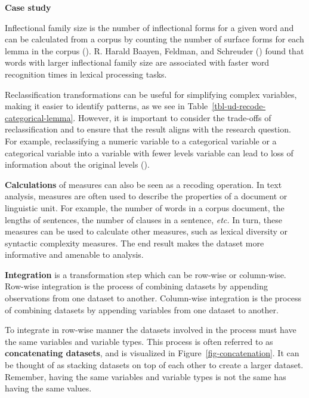 \documentclass[
  letterpaper,
]{latex/krantz}
\theoremstyle{definition}
\theoremstyle{remark}
\begin{document}
\begin{tcolorbox}[enhanced jigsaw, breakable, leftrule=.75mm, arc=.35mm, colframe=quarto-callout-color-frame, colback=white, left=2mm, bottomrule=.15mm, rightrule=.15mm, toprule=.15mm, opacityback=0]

\textbf{ Case study}

Inflectional family size is the number of inflectional forms for a given
word and can be calculated from a corpus by counting the number of
surface forms for each lemma in the corpus
(). R.
Harald Baayen, Feldman, and Schreuder ()
found that words with larger inflectional family size are associated
with faster word recognition times in lexical processing tasks.

\end{tcolorbox}

Reclassification transformations can be useful for simplifying complex
variables, making it easier to identify patterns, as we see in
Table~\ref{tbl-ud-recode-categorical-lemma}. However, it is important to
consider the trade-offs of reclassification and to ensure that the
result aligns with the research question. For example, reclassifying a
numeric variable to a categorical variable or a categorical variable
into a variable with fewer levels variable can lead to loss of
information about the original levels ().

\textbf{Calculations} of measures can also be seen as a recoding
operation. In text analysis, measures are often used to describe the
properties of a document or linguistic unit. For example, the number of
words in a corpus document, the lengths of sentences, the number of
clauses in a sentence, \emph{etc.} In turn, these measures can be used
to calculate other measures, such as lexical diversity or syntactic
complexity measures. The end result makes the dataset more informative
and amenable to analysis.

\textbf{Integration} is a transformation step which can be row-wise or
column-wise. Row-wise integration is the process of combining datasets
by appending observations from one dataset to another. Column-wise
integration is the process of combining datasets by appending variables
from one dataset to another.

To integrate in row-wise manner the datasets involved in the process
must have the same variables and variable types. This process is often
referred to as \textbf{concatenating datasets}, and is visualized in
Figure~\ref{fig-concatenation}. It can be thought of as stacking
datasets on top of each other to create a larger dataset. Remember,
having the same variables and variable types is not the same has having
the same values.
\end{document}
